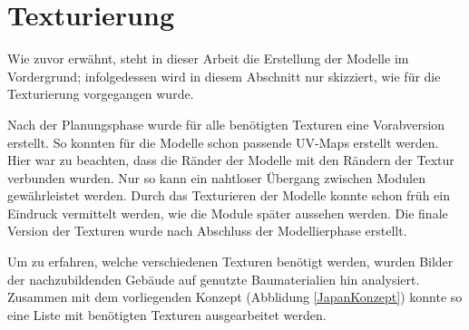\section{Texturierung}
Wie zuvor erwähnt, steht in dieser Arbeit die Erstellung der Modelle im Vordergrund; infolgedessen wird in diesem Abschnitt nur skizziert, wie für die Texturierung vorgegangen wurde.
\par
Nach der Planungsphase wurde für alle benötigten Texturen eine Vorabversion erstellt. So konnten für die Modelle schon passende UV-Maps erstellt werden. Hier war zu beachten, dass die Ränder der Modelle mit den Rändern der Textur verbunden wurden. Nur so kann ein nahtloser Übergang zwischen Modulen gewährleistet werden. Durch das Texturieren der Modelle konnte schon früh ein Eindruck vermittelt werden, wie die Module später aussehen werden. Die finale Version der Texturen wurde nach Abschluss der Modellierphase erstellt.
\par
Um zu erfahren, welche verschiedenen Texturen benötigt werden, wurden Bilder der nachzubildenden Gebäude auf genutzte Baumaterialien hin analysiert. Zusammen mit dem vorliegenden Konzept (Abblidung \ref{JapanKonzept}) konnte so eine Liste mit benötigten Texturen ausgearbeitet werden.
